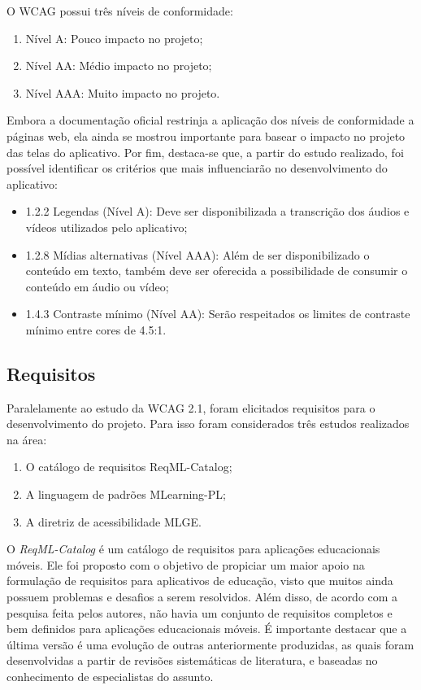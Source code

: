 O WCAG possui três níveis de conformidade:
\begin{enumerate}
    \item Nível A: Pouco impacto no projeto;
    \item Nível AA: Médio impacto no projeto;
    \item Nível AAA: Muito impacto no projeto.
\end{enumerate}

Embora a documentação oficial restrinja a aplicação dos níveis de conformidade a páginas web, ela ainda se mostrou importante para basear o impacto no projeto das telas do aplicativo. 
 Por fim, destaca-se que, a partir do estudo realizado, foi possível identificar os critérios que mais influenciarão no desenvolvimento do aplicativo:

\begin{itemize}
    \item 1.2.2 Legendas (Nível A): Deve ser disponibilizada a transcrição dos áudios e vídeos utilizados pelo aplicativo;
    \item 1.2.8 Mídias alternativas (Nível AAA): Além de ser disponibilizado o conteúdo em texto, também deve ser oferecida a possibilidade de consumir o conteúdo em áudio ou vídeo;
    \item 1.4.3 Contraste mínimo (Nível AA): Serão respeitados os limites de contraste mínimo entre cores de 4.5:1.
\end{itemize}


\subsection{Requisitos}
Paralelamente ao estudo da WCAG 2.1, foram elicitados requisitos para o desenvolvimento do projeto. Para isso foram considerados três estudos realizados na área: 
\begin{enumerate}
    \item O catálogo de requisitos ReqML-Catalog;
    \item A linguagem de padrões MLearning-PL;
    \item A diretriz de acessibilidade MLGE.
\end{enumerate}

O \textit{ReqML-Catalog}
\citep{soad2017reqml} é um catálogo de requisitos para aplicações educacionais móveis. Ele foi proposto com o objetivo de propiciar um maior apoio na formulação de requisitos para aplicativos de educação, visto que muitos ainda possuem problemas e desafios a serem resolvidos. Além disso, de acordo com a pesquisa feita pelos autores, não havia um conjunto de requisitos completos e bem definidos para aplicações educacionais móveis. É importante destacar que a última versão é uma evolução de outras anteriormente produzidas, as quais foram desenvolvidas a partir de revisões sistemáticas de literatura, e baseadas no conhecimento de especialistas do assunto. 

